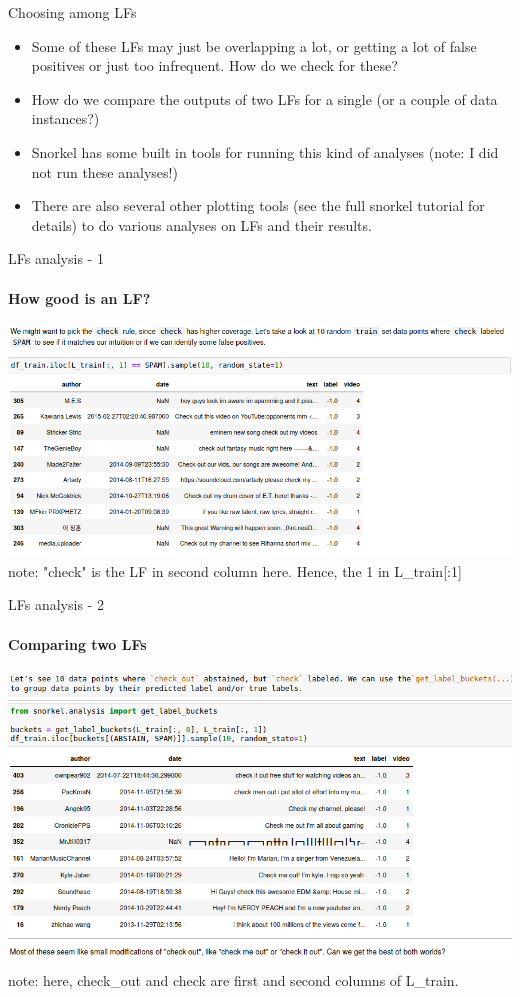 \documentclass{beamer}
\begin{document}
\begin{frame}{Choosing among LFs}
    \begin{itemize}
        \item Some of these LFs may just be overlapping a lot, or getting a lot of false positives or just too infrequent. How do we check for these?
        \item How do we compare the outputs of two LFs for a single (or a couple of data instances?)
        \item Snorkel has some built in tools for running this kind of analyses (note: I did not run these analyses!)
        \item There are also several other plotting tools (see the full snorkel tutorial for details) to do various analyses on LFs and their results. 
    \end{itemize}
\end{frame}

\begin{frame}[fragile]{LFs analysis - 1}
\framesubtitle{How good is an LF?}
\includegraphics[width=\textwidth]{figures/examplelfanalysis1.png}
note: "check" is the LF in second column here. Hence, the 1 in L\_train[:1]
\end{frame}

\begin{frame}[fragile]{LFs analysis - 2}
\framesubtitle{Comparing two LFs}
\includegraphics[width=\textwidth]{figures/examplelfanalysis2.png}
note: here, check\_out and check are first and second columns of L\_train. 
\end{frame}
\end{document}
